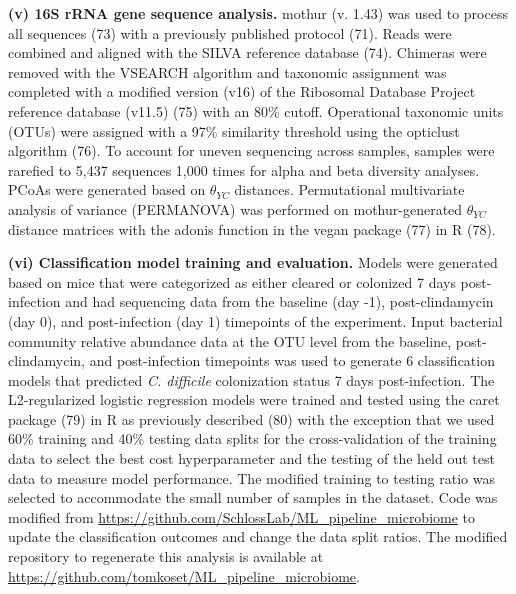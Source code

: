 \documentclass[11pt,]{article}
\begin{document}
\textbf{(v) 16S rRNA gene sequence analysis.} mothur (v. 1.43) was used
to process all sequences (73) with a previously published protocol (71).
Reads were combined and aligned with the SILVA reference database (74).
Chimeras were removed with the VSEARCH algorithm and taxonomic
assignment was completed with a modified version (v16) of the Ribosomal
Database Project reference database (v11.5) (75) with an 80\% cutoff.
Operational taxonomic units (OTUs) were assigned with a 97\% similarity
threshold using the opticlust algorithm (76). To account for uneven
sequencing across samples, samples were rarefied to 5,437 sequences
1,000 times for alpha and beta diversity analyses. PCoAs were generated
based on \(\theta_{YC}\) distances. Permutational multivariate analysis
of variance (PERMANOVA) was performed on mothur-generated
\(\theta_{YC}\) distance matrices with the adonis function in the vegan
package (77) in R (78).

\textbf{(vi) Classification model training and evaluation.} Models were
generated based on mice that were categorized as either cleared or
colonized 7 days post-infection and had sequencing data from the
baseline (day -1), post-clindamycin (day 0), and post-infection (day 1)
timepoints of the experiment. Input bacterial community relative
abundance data at the OTU level from the baseline, post-clindamycin, and
post-infection timepoints was used to generate 6 classification models
that predicted \emph{C. difficile} colonization status 7 days
post-infection. The L2-regularized logistic regression models were
trained and tested using the caret package (79) in R as previously
described (80) with the exception that we used 60\% training and 40\%
testing data splits for the cross-validation of the training data to
select the best cost hyperparameter and the testing of the held out test
data to measure model performance. The modified training to testing
ratio was selected to accommodate the small number of samples in the
dataset. Code was modified from
\url{https://github.com/SchlossLab/ML_pipeline_microbiome} to update the
classification outcomes and change the data split ratios. The modified
repository to regenerate this analysis is available at
\url{https://github.com/tomkoset/ML_pipeline_microbiome}.
\end{document}
